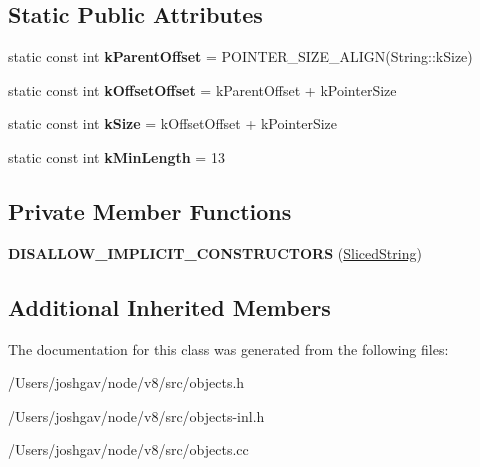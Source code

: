 \subsection*{Static Public Attributes}
\begin{DoxyCompactItemize}
\item 
static const int {\bfseries k\+Parent\+Offset} = P\+O\+I\+N\+T\+E\+R\+\_\+\+S\+I\+Z\+E\+\_\+\+A\+L\+I\+GN(String\+::k\+Size)\hypertarget{classv8_1_1internal_1_1_sliced_string_a2c749fb117a92c9051a49f1c1d77332b}{}\label{classv8_1_1internal_1_1_sliced_string_a2c749fb117a92c9051a49f1c1d77332b}

\item 
static const int {\bfseries k\+Offset\+Offset} = k\+Parent\+Offset + k\+Pointer\+Size\hypertarget{classv8_1_1internal_1_1_sliced_string_a401ed356562a59051bd258ad7c3d4610}{}\label{classv8_1_1internal_1_1_sliced_string_a401ed356562a59051bd258ad7c3d4610}

\item 
static const int {\bfseries k\+Size} = k\+Offset\+Offset + k\+Pointer\+Size\hypertarget{classv8_1_1internal_1_1_sliced_string_aeb78cf184bcdf0b98b21a7440911fef9}{}\label{classv8_1_1internal_1_1_sliced_string_aeb78cf184bcdf0b98b21a7440911fef9}

\item 
static const int {\bfseries k\+Min\+Length} = 13\hypertarget{classv8_1_1internal_1_1_sliced_string_a007f254a8f5d3daeb63aa3dbeba7d123}{}\label{classv8_1_1internal_1_1_sliced_string_a007f254a8f5d3daeb63aa3dbeba7d123}

\end{DoxyCompactItemize}
\subsection*{Private Member Functions}
\begin{DoxyCompactItemize}
\item 
{\bfseries D\+I\+S\+A\+L\+L\+O\+W\+\_\+\+I\+M\+P\+L\+I\+C\+I\+T\+\_\+\+C\+O\+N\+S\+T\+R\+U\+C\+T\+O\+RS} (\hyperlink{classv8_1_1internal_1_1_sliced_string}{Sliced\+String})\hypertarget{classv8_1_1internal_1_1_sliced_string_ae8bd95460fbd1bf6602114ad76c8893c}{}\label{classv8_1_1internal_1_1_sliced_string_ae8bd95460fbd1bf6602114ad76c8893c}

\end{DoxyCompactItemize}
\subsection*{Additional Inherited Members}


The documentation for this class was generated from the following files\+:\begin{DoxyCompactItemize}
\item 
/\+Users/joshgav/node/v8/src/objects.\+h\item 
/\+Users/joshgav/node/v8/src/objects-\/inl.\+h\item 
/\+Users/joshgav/node/v8/src/objects.\+cc\end{DoxyCompactItemize}
